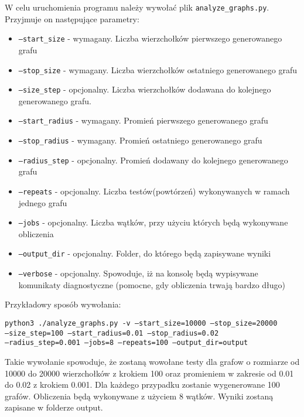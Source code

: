 		\noindent W celu uruchomienia programu należy wywołać plik \texttt{analyze\_graphs.py}. Przyjmuje on następujące parametry:
		\begin{itemize}
			\item \texttt{---start\_size} - wymagany. Liczba wierzchołków pierwszego generowanego grafu

			\item \texttt{---stop\_size} - wymagany. Liczba wierzchołków ostatniego generowanego grafu

			\item \texttt{---size\_step} - opcjonalny. Liczba wierzchołków dodawana do kolejnego generowanego grafu.

			\item \texttt{---start\_radius} - wymagany. Promień pierwszego generowanego grafu

			\item \texttt{---stop\_radius} - wymagany. Promień ostatniego generowanego grafu

			\item \texttt{---radius\_step} - opcjonalny. Promień dodawany do kolejnego generowanego grafu

			\item \texttt{---repeats} - opcjonalny. Liczba testów(powtórzeń) wykonywanych w ramach jednego grafu

			\item \texttt{---jobs} - opcjonalny. Liczba wątków, przy użyciu których będą wykonywane obliczenia

			\item \texttt{---output\_dir} - opcjonalny. Folder, do którego będą zapisywane wyniki

			\item \texttt{---verbose} - opcjonalny. Spowoduje, iż na konsolę będą wypisywane komunikaty diagnostyczne (pomocne, gdy obliczenia trwają bardzo długo)
		\end{itemize}

		Przykładowy sposób wywołania:

		\texttt{python3 ./analyze\_graphs.py -v ---start\_size=10000 ---stop\_size=20000 \\---size\_step=100 ---start\_radius=0.01 ---stop\_radius=0.02 \\---radius\_step=0.001 ---jobs=8 ---repeats=100 ---output\_dir=output}


		Takie wywołanie spowoduje, że zostaną wowołane testy dla grafow o rozmiarze od 10000 do 20000 wierzchołków z krokiem 100 oraz promieniem w zakresie od 0.01 do 0.02 z krokiem 0.001. Dla każdego przypadku zostanie wygenerowane 100 grafów. Obliczenia będą wykonywane z użyciem 8 wątków. Wyniki zostaną zapisane w folderze output.
